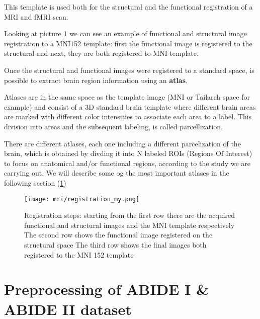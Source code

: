\documentclass[10pt]{report}
\begin{document}
This template is used both for the structural and the functional registration of a MRI and fMRI scan.

Looking at picture \ref{fig:registrationchart} we can see an example of functional and structural image registration to a MNI152 template: first the functional image is registered to the structural and next, they are both registered to MNI template.

Once the structural and functional images were registered to a standard space, is possible to extract brain region information using an \textbf{atlas}.

Atlases are in the same space as the template image (MNI or Tailarch space for example) and consist of a 3D standard brain template where different brain areas are marked with different color intensities to associate each area to a label.
This division into areas and the subsequent labeling, is called parcellization.

There are different atlases, each one including a different parcelization of the brain, which is obtained by divding it into N labeled ROIs
(Regions Of Interest) to focus on anatomical and/or functional regions, according to the study we are carrying out.
We will describe some og the most important atlases in the following section (\ref{sec:cpac})




\begin{figure}
\centering
\texttt{[image: mri/registration\_my.png]}
\caption{Registration steps:
 starting from the first row there are the acquired functional and structural images and the MNI template respectively
 The second row shows the functional image registered on the structural space
 The third row shows the final images both registered to the MNI 152 template
}
\label{fig:registrationchart}
\end{figure}



\section{Preprocessing of ABIDE I \& ABIDE II dataset}\label{sec:cpac}
\end{document}
